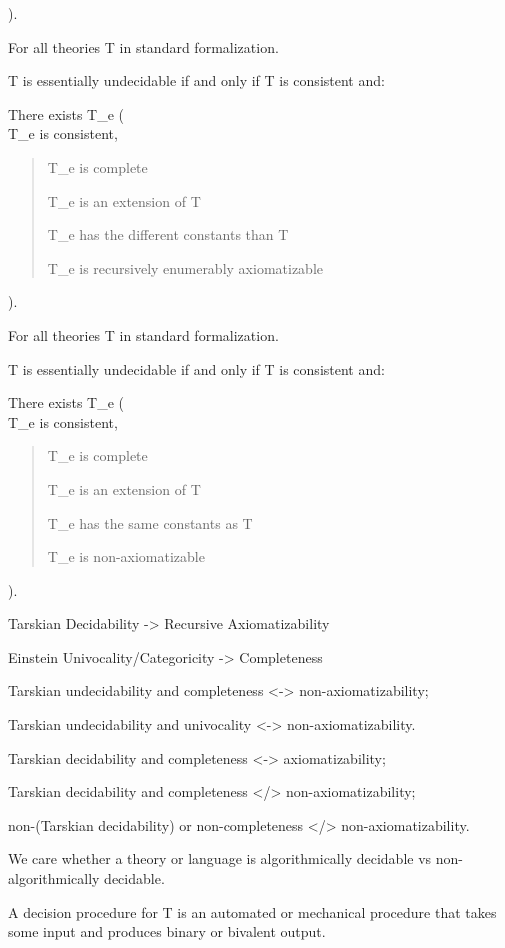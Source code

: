 ).

For all theories T in standard formalization.

T is essentially undecidable if and only if T is consistent and:

There exists T\_e (\\
T\_e is consistent,

\begin{quote}
T\_e is complete

T\_e is an extension of T

T\_e has the different constants than T

T\_e is recursively enumerably axiomatizable
\end{quote}

).

For all theories T in standard formalization.

T is essentially undecidable if and only if T is consistent and:

There exists T\_e (\\
T\_e is consistent,

\begin{quote}
T\_e is complete

T\_e is an extension of T

T\_e has the same constants as T

T\_e is non-axiomatizable
\end{quote}

).

Tarskian Decidability -\textgreater{} Recursive Axiomatizability

Einstein Univocality/Categoricity -\textgreater{} Completeness

Tarskian undecidability and completeness \textless-\textgreater{}
non-axiomatizability;

Tarskian undecidability and univocality \textless-\textgreater{}
non-axiomatizability.

Tarskian decidability and completeness \textless-\textgreater{}
axiomatizability;

Tarskian decidability and completeness \textless/\textgreater{}
non-axiomatizability;

non-(Tarskian decidability) or non-completeness \textless/\textgreater{}
non-axiomatizability.

We care whether a theory or language is algorithmically decidable vs
non-algorithmically decidable.

A decision procedure for T is an automated or mechanical procedure that
takes some input and produces binary or bivalent output.

